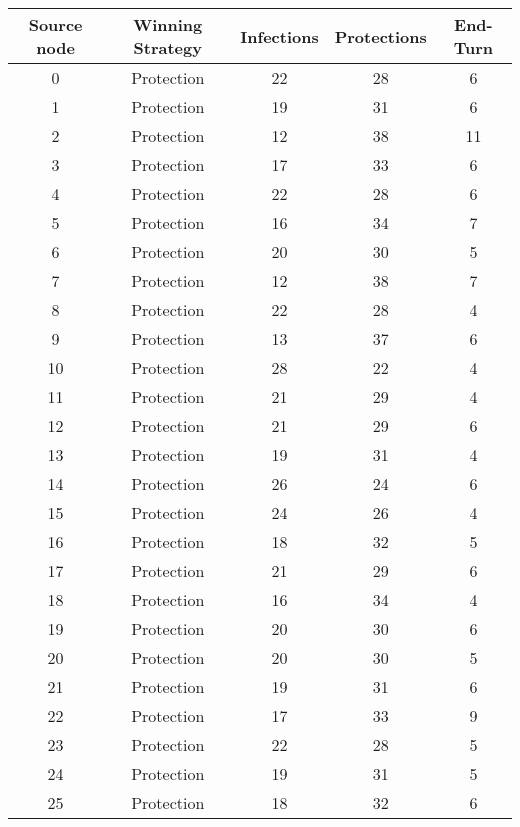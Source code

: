 \documentclass[results.tex]{subfiles}
\begin{document}
\begin{center}
  \begin{tabular}{| c || c | c | c | c |}
    \hline
    {\bfseries Source node} & {\bfseries Winning Strategy} & {\bfseries Infections} & {\bfseries Protections} & {\bfseries End-Turn} \\  %
    \hline\hline
    0 & Protection & 22 & 28 & 6 \\ 
    \hline
    1 & Protection & 19 & 31 & 6 \\ 
    \hline
    2 & Protection & 12 & 38 & 11 \\ 
    \hline
    3 & Protection & 17 & 33 & 6 \\ 
    \hline
    4 & Protection & 22 & 28 & 6 \\ 
    \hline
    5 & Protection & 16 & 34 & 7 \\ 
    \hline
    6 & Protection & 20 & 30 & 5 \\ 
    \hline
    7 & Protection & 12 & 38 & 7 \\ 
    \hline
    8 & Protection & 22 & 28 & 4 \\ 
    \hline
    9 & Protection & 13 & 37 & 6 \\ 
    \hline
    10 & Protection & 28 & 22 & 4 \\ 
    \hline
    11 & Protection & 21 & 29 & 4 \\ 
    \hline
    12 & Protection & 21 & 29 & 6 \\ 
    \hline
    13 & Protection & 19 & 31 & 4 \\ 
    \hline
    14 & Protection & 26 & 24 & 6 \\ 
    \hline
    15 & Protection & 24 & 26 & 4 \\ 
    \hline
    16 & Protection & 18 & 32 & 5 \\ 
    \hline
    17 & Protection & 21 & 29 & 6 \\ 
    \hline
    18 & Protection & 16 & 34 & 4 \\ 
    \hline
    19 & Protection & 20 & 30 & 6 \\ 
    \hline
    20 & Protection & 20 & 30 & 5 \\ 
    \hline
    21 & Protection & 19 & 31 & 6 \\ 
    \hline
    22 & Protection & 17 & 33 & 9 \\ 
    \hline
    23 & Protection & 22 & 28 & 5 \\ 
    \hline
    24 & Protection & 19 & 31 & 5 \\ 
    \hline
    25 & Protection & 18 & 32 & 6 \\ 

\end{tabular}
\end{center}
\end{document}
